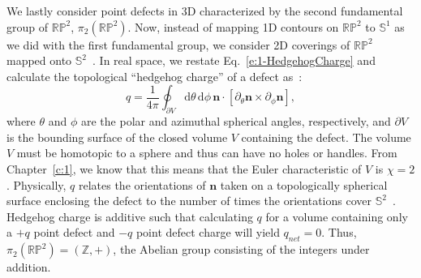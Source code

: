 We lastly consider point defects in 3D characterized by the second fundamental group of $\mathbb{R}\mathbb{P}^2$, $\pi_{2}(\mathbb{R}\mathbb{P}^2)$.
Now, instead of mapping 1D contours on $\mathbb{R}\mathbb{P}^2$ to $\mathbb{S}^1$ as we did with the first fundamental group, we consider 2D coverings of $\mathbb{R}\mathbb{P}^2$ mapped onto $\mathbb{S}^2$~\cite{RN196,RN153,RN236}.
In real space, we restate Eq.~\ref{e:1-HedgehogCharge} and calculate the topological ``hedgehog charge'' of a defect as~\cite{RN153}:
\begin{equation}
  q = \frac{1}{4 \pi} \oint_{\partial V} \textrm{d} \theta \, \textrm{d} \phi \, \mathbf{n} \cdot \left [ \partial_{\theta} \mathbf{n} \times \partial_{\phi} \mathbf{n} \right ],\label{e:2-hedCharge}
\end{equation}
 where $\theta$ and $\phi$ are the polar and azimuthal spherical angles, respectively, and $\partial V$ is the bounding surface of the closed volume $V$ containing the defect.
The volume $V$ must be homotopic to a sphere and thus can have no holes or handles.
From Chapter~\ref{c:1}, we know that this means that the Euler characteristic of $V$ is $\chi = 2$.
Physically, $q$ relates the orientations of $\mathbf{n}$ taken on a topologically spherical surface enclosing the defect to the number of times the orientations cover $\mathbb{S}^2$~\cite{RN153}.
Hedgehog charge is additive such that calculating $q$ for a volume containing only a $+q$ point defect and $-q$ point defect charge will yield $q_{net} = 0$.
Thus, $\pi_{2}(\mathbb{R}\mathbb{P}^2) = (\mathbb{Z}, +)$, the Abelian group consisting of the integers under addition.

